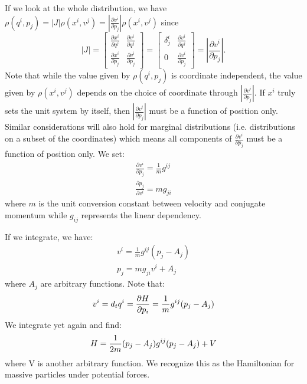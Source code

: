 \documentclass[letterpaper]{article}
\begin{document}
If we look at the whole distribution, we have $\rho(q^i, p_j) = |J| \rho(x^i, v^j) = \left|\frac{\partial v^i}{\partial p_j}\right| \rho(x^i, v^j)$ since
\begin{equation}
|J| = \begin{bmatrix}
\frac{\partial x^i}{\partial q^j} & \frac{\partial v^i}{\partial q^j} \\
\frac{\partial x^i}{\partial p_j} & \frac{\partial v^i}{\partial p_j}
\end{bmatrix}
= \begin{bmatrix}
\delta^i_j & \frac{\partial v^i}{\partial q^j} \\
0 & \frac{\partial v^i}{\partial p_j}
\end{bmatrix}
= \left|\frac{\partial v^i}{\partial p_j}\right|.
\end{equation}
Note that while the value given by $\rho(q^i, p_j)$ is coordinate independent, the value given by $\rho(x^i, v^j)$ depends on the choice of coordinate through $\left|\frac{\partial v^i}{\partial p_j}\right|$. If $x^i$ truly sets the unit system by itself, then $\left|\frac{\partial v^i}{\partial p_j}\right|$ must be a function of position only. Similar considerations will also hold for marginal distributions (i.e. distributions on a subset of the coordinates) which means all components of $\frac{\partial v^i}{\partial p_j}$ must be a function of position only. We set:
\begin{equation}
\begin{aligned}
\frac{\partial v^i}{\partial p_j} = \frac{1}{m} g^{ij} \\
\frac{\partial p_j}{\partial v^i} = m g_{ji}
\end{aligned}
\end{equation}
where $m$ is the unit conversion constant between velocity and conjugate momentum while $g_{ij}$ represents the linear dependency.

If we integrate, we have:
\begin{equation}
\begin{aligned}
v^i = \frac{1}{m} g^{ij}(p_j - A_j) \\
p_j = m g_{ji} v^i + A_j
\end{aligned}
\end{equation}
where $A_j$ are arbitrary functions. Note that:
\begin{equation}
v^i = d_t q^i = \frac{\partial H }{\partial p_i} = \frac{1}{m} g^{ij}(p_j - A_j) \\
\end{equation}
We integrate yet again and find:
\begin{equation}
H = \frac{1}{2m} (p_j - A_j) g^{ij}(p_j - A_j) + V \\
\end{equation}
where V is another arbitrary function. We recognize this as the Hamiltonian for massive particles under potential forces.
\end{document}
